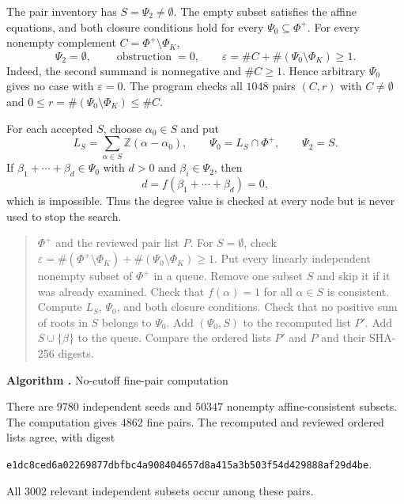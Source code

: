 \documentclass[11pt]{amsart}
\newcommand{\Z}{\mathbb Z}
\newcommand{\algorithmcaption}[2]{%
  \refstepcounter{figure}\label{#2}%
  \begin{center}\small\textbf{Algorithm \thefigure.} #1\end{center}}
\begin{document}
The pair inventory has $S=\Psi_2\ne\emptyset$.  The empty subset satisfies the
affine equations, and both closure conditions hold for every
$\Psi_0\subseteq\Phi^+$.  For every nonempty complement
$C=\Phi^+\setminus\Phi_K$,
\[
\Psi_2=\emptyset,\qquad
\operatorname{obstruction}=0,\qquad
\varepsilon=\#C+\#(\Psi_0\setminus\Phi_K)\ge1.
\]
Indeed, the second summand is nonnegative and $\#C\ge1$.  Hence arbitrary
$\Psi_0$ gives no case with $\varepsilon=0$.  The program checks all $1048$
pairs $(C,r)$ with $C\ne\emptyset$ and
$0\le r=\#(\Psi_0\setminus\Phi_K)\le\#C$.

For each accepted $S$, choose $\alpha_0\in S$ and put
\[
L_S=\sum_{\alpha\in S}\Z(\alpha-\alpha_0),\qquad
\Psi_0=L_S\cap\Phi^+,
\qquad \Psi_2=S.
\]
If $\beta_1+\cdots+\beta_d\in\Psi_0$ with $d>0$ and
$\beta_i\in\Psi_2$, then
\[
d=f(\beta_1+\cdots+\beta_d)=0,
\]
which is impossible.  Thus the degree value is checked at every node but is
never used to stop the search.

\begin{quote}
\begin{algorithmic}[1]
\Require $\Phi^+$ and the reviewed pair list $P$.
\State For $S=\emptyset$, check
$\varepsilon=\#(\Phi^+\setminus\Phi_K)
+\#(\Psi_0\setminus\Phi_K)\ge1$.
\State Put every linearly independent nonempty subset of $\Phi^+$ in a queue.
  \State Remove one subset $S$ and skip it if it was already examined.
  \State Check that $f(\alpha)=1$ for all $\alpha\in S$ is consistent.
  \State Compute $L_S$, $\Psi_0$, and both closure conditions.
  \State Check that no positive sum of roots in $S$ belongs to $\Psi_0$.
    \State Add $(\Psi_0,S)$ to the recomputed list $P'$.
  \EndIf
      \State Add $S\cup\{\beta\}$ to the queue.
    \EndIf
  \EndFor
\EndWhile
\State Compare the ordered lists $P'$ and $P$ and their SHA-256 digests.
\end{algorithmic}
\end{quote}
\algorithmcaption{No-cutoff fine-pair computation}{alg:f4-pairs}

There are $9780$ independent seeds and $50347$ nonempty affine-consistent subsets.
The computation gives $4862$ fine pairs.  The recomputed and reviewed ordered
lists agree, with digest
\begin{center}
\scriptsize
\texttt{e1dc8ced6a02269877dbfbc4a908404657d8a415a3b503f54d429888af29d4be}.
\end{center}
All $3002$ relevant independent subsets occur among these pairs.
\end{document}

